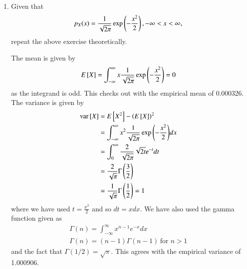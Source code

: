 \documentclass[journal,12pt,twocolumn]{IEEEtran}
\renewcommand\thesection{\arabic{section}}
\begin{document}
\begin{enumerate}[label=\thesection.\arabic*
,ref=\thesection.\theenumi]
\noindent The C program can be downloaded using
\begin{lstlisting}
$ wget https://raw.githubusercontent.com/goats-9/ai1110-assignments/master/manual/codes/2_4.c
\end{lstlisting}
and compiled and executed with the following commands
\begin{lstlisting}
$ gcc 2_4.c -lm -Wall -g
$ ./a.out
\end{lstlisting}
The calculated mean is 0.000326 and the calculated variance is 1.000906.

\item Given that 
\begin{align}
p_{X}(x) = \frac{1}{\sqrt{2\pi}}\exp\left(-\frac{x^2}{2}\right), -\infty < x < \infty,
\end{align}
repeat the above exercise theoretically.

\solution
The mean is given by
		\begin{align}
			E{}\left[X\right] = \int_{-\infty}^{\infty}x\frac{1}{\sqrt{2\pi}}\exp{\left(-\frac{x^2}{2}\right)} = 0
			\label{eq:gau-mean}
		\end{align}
as the integrand is odd. This checks out with the empirical mean of 0.000326. The variance is given by
		\begin{align}
			\text{var}{}\left[X\right] &= E{}\left[X^2\right] - \left(E{}\left[X\right]\right)^2 \\
			&= \int_{-\infty}^{\infty}x^2\frac{1}{\sqrt{2\pi}}\exp{\left(-\frac{x^2}{2}\right)}dx \label{eq:int} \\
			&= \int_{0}^{\infty}\frac{2}{\sqrt{2\pi}}\sqrt{2t}e^{-t}dt \\
			&= \frac{2}{\sqrt{\pi}}\Gamma\left(\frac{3}{2}\right) \\
			&= \frac{1}{\sqrt{\pi}}\Gamma\left(\frac{1}{2}\right) = 1
			\label{eq:gau-var}
		\end{align}
where we have used $t = \frac{x^2}{2}$ and so $dt = xdx$. We have also used the gamma function given as
\begin{align}
	\Gamma(n) = \int_{-\infty}^{\infty}x^{n - 1}e^{-x}dx \\
	\Gamma(n) = (n - 1)\Gamma(n - 1)\ \text{for $n > 1$}
\end{align}
and the fact that $\Gamma(1/2) = \sqrt{\pi}$.
This agrees with the empirical variance of 1.000906.
%
\end{enumerate}
\end{document}
